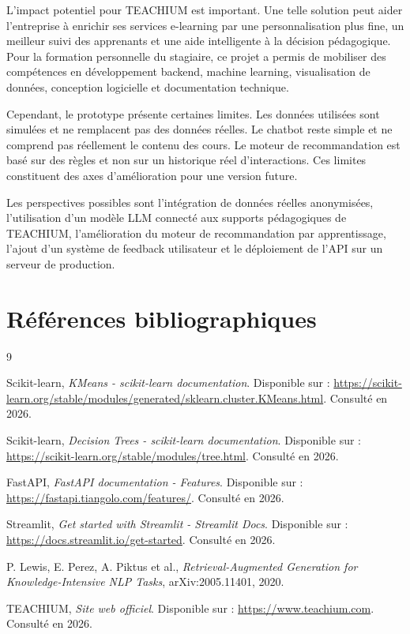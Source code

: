 \documentclass[12pt,a4paper]{report}
\begin{document}
L'impact potentiel pour TEACHIUM est important. Une telle solution peut aider l'entreprise à enrichir ses services e-learning par une personnalisation plus fine, un meilleur suivi des apprenants et une aide intelligente à la décision pédagogique. Pour la formation personnelle du stagiaire, ce projet a permis de mobiliser des compétences en développement backend, machine learning, visualisation de données, conception logicielle et documentation technique.

Cependant, le prototype présente certaines limites. Les données utilisées sont simulées et ne remplacent pas des données réelles. Le chatbot reste simple et ne comprend pas réellement le contenu des cours. Le moteur de recommandation est basé sur des règles et non sur un historique réel d'interactions. Ces limites constituent des axes d'amélioration pour une version future.

Les perspectives possibles sont l'intégration de données réelles anonymisées, l'utilisation d'un modèle LLM connecté aux supports pédagogiques de TEACHIUM, l'amélioration du moteur de recommandation par apprentissage, l'ajout d'un système de feedback utilisateur et le déploiement de l'API sur un serveur de production.

\chapter*{Références bibliographiques}

\begin{thebibliography}{9}

Scikit-learn, \textit{KMeans - scikit-learn documentation}. Disponible sur : \url{https://scikit-learn.org/stable/modules/generated/sklearn.cluster.KMeans.html}. Consulté en 2026.

Scikit-learn, \textit{Decision Trees - scikit-learn documentation}. Disponible sur : \url{https://scikit-learn.org/stable/modules/tree.html}. Consulté en 2026.

FastAPI, \textit{FastAPI documentation - Features}. Disponible sur : \url{https://fastapi.tiangolo.com/features/}. Consulté en 2026.

Streamlit, \textit{Get started with Streamlit - Streamlit Docs}. Disponible sur : \url{https://docs.streamlit.io/get-started}. Consulté en 2026.

P. Lewis, E. Perez, A. Piktus et al., \textit{Retrieval-Augmented Generation for Knowledge-Intensive NLP Tasks}, arXiv:2005.11401, 2020.

TEACHIUM, \textit{Site web officiel}. Disponible sur : \url{https://www.teachium.com}. Consulté en 2026.

\end{thebibliography}
\end{document}
